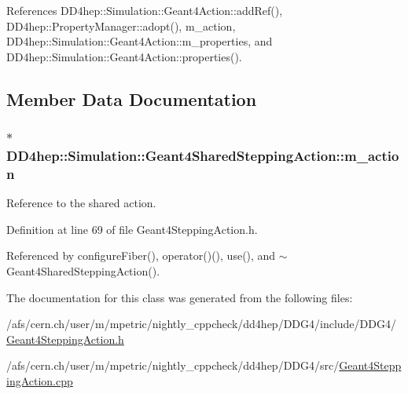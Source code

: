 References DD4hep::Simulation::Geant4Action::addRef(), DD4hep::PropertyManager::adopt(), m\_\-action, DD4hep::Simulation::Geant4Action::m\_\-properties, and DD4hep::Simulation::Geant4Action::properties().

\subsection{Member Data Documentation}
\hypertarget{class_d_d4hep_1_1_simulation_1_1_geant4_shared_stepping_action_a193a6e462877931a4423e15174aa5a7b}{
\subsubsection[{m\_\-action}]{$\ast$ {\bf DD4hep::Simulation::Geant4SharedSteppingAction::m\_\-action}}}
\label{class_d_d4hep_1_1_simulation_1_1_geant4_shared_stepping_action_a193a6e462877931a4423e15174aa5a7b}


Reference to the shared action. 

Definition at line 69 of file Geant4SteppingAction.h.

Referenced by configureFiber(), operator()(), use(), and $\sim$Geant4SharedSteppingAction().

The documentation for this class was generated from the following files:\begin{DoxyCompactItemize}
\item 
/afs/cern.ch/user/m/mpetric/nightly\_\-cppcheck/dd4hep/DDG4/include/DDG4/\hyperlink{_geant4_stepping_action_8h}{Geant4SteppingAction.h}\item 
/afs/cern.ch/user/m/mpetric/nightly\_\-cppcheck/dd4hep/DDG4/src/\hyperlink{_geant4_stepping_action_8cpp}{Geant4SteppingAction.cpp}\end{DoxyCompactItemize}
